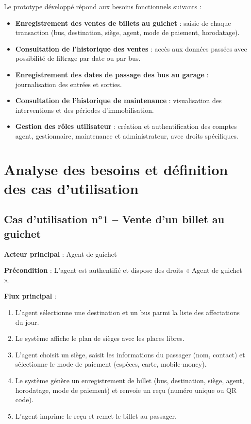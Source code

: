 \documentclass[a4paper, 12pt]{book}
\begin{document}
Le prototype développé répond aux besoins fonctionnels suivants :
\begin{itemize}
    \item \textbf{Enregistrement des ventes de billets au guichet} : saisie de chaque transaction (bus, destination, siège, agent, mode de paiement, horodatage).
    \item \textbf{Consultation de l'historique des ventes} : accès aux données passées avec possibilité de filtrage par date ou par bus.
    \item \textbf{Enregistrement des dates de passage des bus au garage} : journalisation des entrées et sorties.
    \item \textbf{Consultation de l'historique de maintenance} : visualisation des interventions et des périodes d'immobilisation.
    \item \textbf{Gestion des rôles utilisateur} : création et authentification des comptes agent, gestionnaire, maintenance et administrateur, avec droits spécifiques.
\end{itemize}

\section{Analyse des besoins et définition des cas d'utilisation}

\subsection{Cas d'utilisation n°1 – Vente d'un billet au guichet}

\textbf{Acteur principal} : Agent de guichet

\textbf{Précondition} : L'agent est authentifié et dispose des droits « Agent de guichet ».

\textbf{Flux principal} :
\begin{enumerate}
    \item L'agent sélectionne une destination et un bus parmi la liste des affectations du jour.
    \item Le système affiche le plan de sièges avec les places libres.
    \item L'agent choisit un siège, saisit les informations du passager (nom, contact) et sélectionne le mode de paiement (espèces, carte, mobile-money).
    \item Le système génère un enregistrement de billet (bus, destination, siège, agent, horodatage, mode de paiement) et renvoie un reçu (numéro unique ou QR code).
    \item L'agent imprime le reçu et remet le billet au passager.
\end{enumerate}
\end{document}
